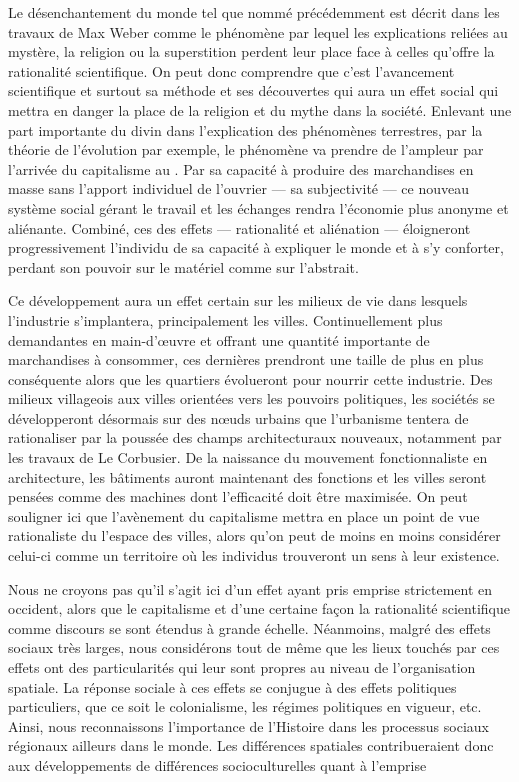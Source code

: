 Le désenchantement du monde tel que nommé précédemment est décrit dans les travaux de Max Weber comme le phénomène par lequel les explications reliées au mystère, la religion ou la superstition perdent leur place face à celles qu'offre la rationalité scientifique. 
On peut donc comprendre que c'est l'avancement scientifique et surtout sa méthode et ses découvertes qui aura un effet social qui mettra en danger la place de la religion et du mythe dans la société. 
Enlevant une part importante du divin dans l'explication des phénomènes terrestres, par la théorie de l'évolution par exemple, le phénomène va prendre de l'ampleur par l'arrivée du capitalisme au .
Par sa capacité à produire des marchandises en masse sans l'apport individuel de l'ouvrier --- sa subjectivité --- ce nouveau système social gérant le travail et les échanges rendra l'économie plus anonyme et aliénante. 
Combiné, ces des effets --- rationalité et aliénation --- éloigneront progressivement l'individu de sa capacité à expliquer le monde et à s'y conforter, perdant son pouvoir sur le matériel comme sur l'abstrait.

Ce développement aura un effet certain sur les milieux de vie dans lesquels l'industrie s'implantera, principalement les villes. 
Continuellement plus demandantes en main-d’œuvre et offrant une quantité importante de marchandises à consommer, ces dernières prendront une taille de plus en plus conséquente alors que les quartiers évolueront pour nourrir cette industrie. 
Des milieux villageois aux villes orientées vers les pouvoirs politiques, les sociétés se développeront désormais sur des nœuds urbains que l'urbanisme tentera de rationaliser par la poussée des champs architecturaux nouveaux, notamment par les travaux de Le Corbusier. 
De la naissance du mouvement fonctionnaliste en architecture, les bâtiments auront maintenant des fonctions et les villes seront pensées comme des machines dont l'efficacité doit être maximisée\missref{}. 
On peut souligner ici que l'avènement du capitalisme mettra en place un point de vue rationaliste du l'espace des villes, alors qu'on peut de moins en moins considérer celui-ci comme un territoire où les individus trouveront un sens à leur existence.

Nous ne croyons pas qu'il s'agit ici d'un effet ayant pris emprise strictement en occident, alors que le capitalisme et d'une certaine façon la rationalité scientifique comme discours se sont étendus à grande échelle. 
Néanmoins, malgré des effets sociaux très larges, nous considérons tout de même que les lieux touchés par ces effets ont des particularités qui leur sont propres au niveau de l'organisation spatiale.
La réponse sociale à ces effets se conjugue à des effets politiques particuliers, que ce soit le colonialisme, les régimes politiques en vigueur, etc. 
Ainsi, nous reconnaissons l'importance de l'Histoire dans les processus sociaux régionaux ailleurs dans le monde. 
Les différences spatiales contribueraient donc aux développements de différences socioculturelles quant à l'emprise 


